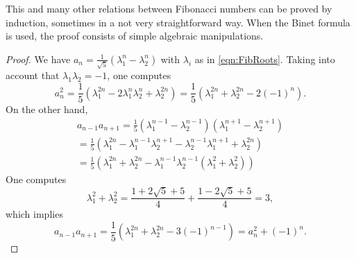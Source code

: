 This and many other relations between Fibonacci numbers can be proved by induction,
sometimes in a not very straightforward way.
When the Binet formula is used, the proof consists of simple algebraic manipulations.

\begin{proof}
We have $a_n = \frac{1}{\sqrt{5}}(\lambda_1^n - \lambda_2^n)$ with $\lambda_i$ as in \eqref{eqn:FibRoots}.
Taking into account that $\lambda_1\lambda_2 = -1$, one computes
\[
a_n^2 = \frac15(\lambda_1^{2n} - 2 \lambda_1^n \lambda_2^n + \lambda_2^{2n}) = \frac15(\lambda_1^{2n} + \lambda_2^{2n} - 2(-1)^n).
\]
On the other hand,
\begin{multline*}
a_{n-1} a_{n+1} = \frac15(\lambda_1^{n-1} - \lambda_2^{n-1})(\lambda_1^{n+1} - \lambda_2^{n+1})\\
= \frac15(\lambda_1^{2n} - \lambda_1^{n-1}\lambda_2^{n+1} - \lambda_2^{n-1}\lambda_1^{n+1} + \lambda_2^{2n})\\
= \frac15(\lambda_1^{2n} + \lambda_2^{2n} - \lambda_1^{n-1}\lambda_2^{n-1}(\lambda_1^2 + \lambda_2^2))
\end{multline*}
One computes
\[
\lambda_1^2 + \lambda_2^2 = \frac{1 + 2\sqrt{5} + 5}4 + \frac{1 - 2\sqrt{5} + 5}4 = 3,
\]
which implies
\[
a_{n-1} a_{n+1} = \frac15(\lambda_1^{2n} + \lambda_2^{2n} - 3(-1)^{n-1}) = a_n^2 + (-1)^n.
\]
\end{proof}



